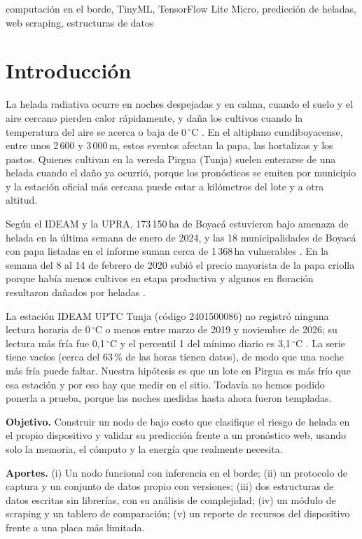 \documentclass[conference]{IEEEtran}
\begin{document}
\begin{IEEEkeywords}
computaci\'on en el borde, TinyML, TensorFlow Lite Micro, predicci\'on de heladas, web scraping, estructuras de datos
\end{IEEEkeywords}

\section{Introducci\'on}
La helada radiativa ocurre en noches despejadas y en calma, cuando el suelo y el aire cercano pierden calor r\'apidamente, y da\~na los cultivos cuando la temperatura del aire se acerca o baja de 0\,$^\circ$C \cite{fao_frost}. En el altiplano cundiboyacense, entre unos 2\,600 y 3\,000\,m, estos eventos afectan la papa, las hortalizas y los pastos. Quienes cultivan en la vereda Pirgua (Tunja) suelen enterarse de una helada cuando el da\~no ya ocurri\'o, porque los pron\'osticos se emiten por municipio y la estaci\'on oficial m\'as cercana puede estar a kil\'ometros del lote y a otra altitud.

Seg\'un el IDEAM y la UPRA, 173\,150\,ha de Boyac\'a estuvieron bajo amenaza de helada en la \'ultima semana de enero de 2024, y las 18 municipalidades de Boyac\'a con papa listadas en el informe suman cerca de 1\,368\,ha vulnerables \cite{upra2024}. En la semana del 8 al 14 de febrero de 2020 subi\'o el precio mayorista de la papa criolla porque hab\'ia menos cultivos en etapa productiva y algunos en floraci\'on resultaron da\~nados por heladas \cite{dane2020}.

La estaci\'on IDEAM UPTC Tunja (c\'odigo 2401500086) no registr\'o ninguna lectura horaria de 0\,$^\circ$C o menos entre marzo de 2019 y noviembre de 2026; su lectura m\'as fr\'ia fue 0,1\,$^\circ$C y el percentil 1 del m\'inimo diario es 3,1\,$^\circ$C \cite{ideam_data}. La serie tiene vac\'ios (cerca del 63\,\% de las horas tienen datos), de modo que una noche m\'as fr\'ia puede faltar. Nuestra hip\'otesis es que un lote en Pirgua es m\'as fr\'io que esa estaci\'on y por eso hay que medir en el sitio. Todav\'ia no hemos podido ponerla a prueba, porque las noches medidas hasta ahora fueron templadas.

\textbf{Objetivo.} Construir un nodo de bajo costo que clasifique el riesgo de helada en el propio dispositivo y validar su predicci\'on frente a un pron\'ostico web, usando solo la memoria, el c\'omputo y la energ\'ia que realmente necesita.

\textbf{Aportes.} (i) Un nodo funcional con inferencia en el borde; (ii) un protocolo de captura y un conjunto de datos propio con versiones; (iii) dos estructuras de datos escritas sin librer\'ias, con su an\'alisis de complejidad; (iv) un m\'odulo de scraping y un tablero de comparaci\'on; (v) un reporte de recursos del dispositivo frente a una placa m\'as limitada.
\end{document}
